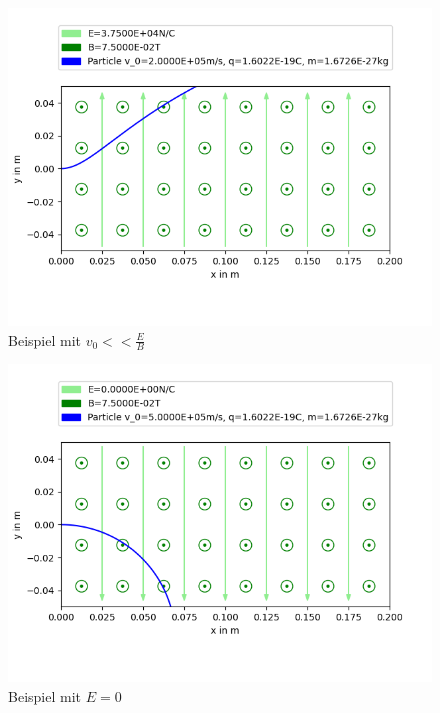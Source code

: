 \documentclass[german, a4paper, 10pt]{article}
\begin{document}
\begin{figure}[ht]
\caption{Beispiel mit $v_0<<\frac{E}{B}$}
\centering
\includegraphics[width=\textwidth]{figure_5}
\end{figure}
\begin{figure}[ht]
\caption{Beispiel mit $E=0$}
\centering
\includegraphics[width=\textwidth]{figure_6}
\end{figure}
\end{document}
